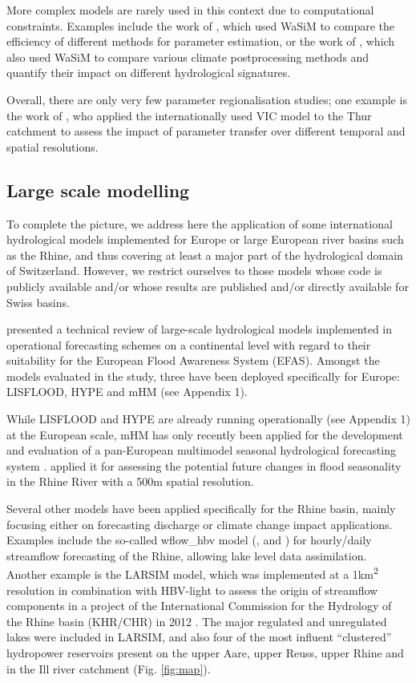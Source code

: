 \documentclass[10pt,a4paper]{article}
\begin{document}
More complex models are rarely used in this context due to computational constraints. Examples include the work of \citet{Cullmann2011}, which used WaSiM to compare the efficiency of different methods for parameter estimation, or the work of \citet{Rossler2019}, which also used WaSiM to compare various climate postprocessing methods and quantify their impact on different hydrological signatures. 

Overall, there are only very few parameter regionalisation studies; one example is the work of \citet{Melsen2016}, who applied the internationally used VIC model to the Thur catchment to assess the impact of parameter transfer over different temporal and spatial resolutions.

\subsection{Large scale modelling}
\label{sec:application:largescale}

To complete the picture, we address here the application of some international hydrological models implemented for Europe or large European river basins such as the Rhine, and thus covering at least a major part of the hydrological domain of Switzerland. However, we restrict ourselves to those models whose code is publicly available and/or whose results are published and/or directly available for Swiss basins. 

\citet{Kauffeldt_2016} presented a technical review of large-scale hydrological models implemented in operational forecasting schemes on a continental level with regard to their suitability for the European Flood Awareness System (EFAS). Amongst the models evaluated in the study, three have been deployed specifically for Europe: LISFLOOD, HYPE and mHM (see Appendix 1).

While LISFLOOD and HYPE are already running operationally (see Appendix 1) at the European scale, mHM has only recently been applied for the development and evaluation of a pan-European multimodel seasonal hydrological forecasting system \citep{Wanders_2019}. \citet{Rottler2020} applied it for assessing the potential future changes in flood seasonality in the Rhine River with a 500m spatial resolution. 

Several other models have been applied specifically for the Rhine basin, mainly focusing either on forecasting discharge or climate change impact applications. Examples include the so-called wflow\_hbv model (\citealp{van_Osnabrugge_2017}, \citealp{van_Osnabrugge_2019} and \citealt{van_Osnabrugge}) for hourly/daily streamflow forecasting of the Rhine, allowing lake level data assimilation. Another example is the LARSIM model, which was implemented at a 1km\textsuperscript{2} resolution in combination with HBV-light to assess the origin of streamflow components in a project of the International Commission for the Hydrology of the Rhine basin (KHR/CHR) in 2012 \citep{m2017}. The major regulated and unregulated lakes were included in LARSIM, and also four of the most influent ``clustered'' hydropower reservoirs present on the upper Aare, upper Reuss, upper Rhine and in the Ill river catchment (Fig. \ref{fig:map}).
\end{document}
